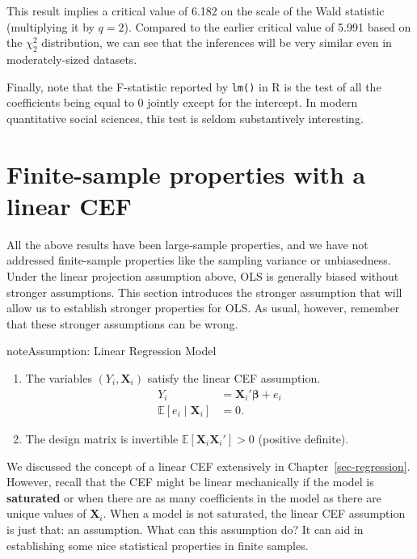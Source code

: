 \documentclass[
  13pt,
  letterpaper,
  DIV=11,
  numbers=noendperiod]{scrreprt}
\newcommand{\mb}{\bm}
\newcommand{\E}{\mathbb{E}}
\newcommand{\X}{\mb{X}}
\newcommand{\bfbeta}{\mb{\beta}}
\theoremstyle{plain}
\theoremstyle{plain}
\theoremstyle{definition}
\theoremstyle{definition}
\theoremstyle{remark}
\begin{document}
This result implies a critical value of 6.182 on the scale of the Wald
statistic (multiplying it by \(q = 2\)). Compared to the earlier
critical value of 5.991 based on the \(\chi^2_2\) distribution, we can
see that the inferences will be very similar even in moderately-sized
datasets.

Finally, note that the F-statistic reported by \texttt{lm()} in R is the
test of all the coefficients being equal to 0 jointly except for the
intercept. In modern quantitative social sciences, this test is seldom
substantively interesting.

\section{Finite-sample properties with a linear
CEF}\label{finite-sample-properties-with-a-linear-cef}

All the above results have been large-sample properties, and we have not
addressed finite-sample properties like the sampling variance or
unbiasedness. Under the linear projection assumption above, OLS is
generally biased without stronger assumptions. This section introduces
the stronger assumption that will allow us to establish stronger
properties for OLS. As usual, however, remember that these stronger
assumptions can be wrong.

\begin{bookcallout}{note}{Assumption: Linear Regression Model}

\begin{enumerate}
\def\labelenumi{\arabic{enumi}.}
\item
  The variables \((Y_{i}, \X_{i})\) satisfy the linear CEF assumption.
  \[ 
  \begin{aligned}
    Y_{i} &= \X_{i}'\bfbeta + e_{i} \\
    \E[e_{i}\mid \X_{i}] & = 0.
  \end{aligned}
  \]
\item
  The design matrix is invertible \(\E[\X_{i}\X_{i}'] > 0\) (positive
  definite).
\end{enumerate}

\end{bookcallout}

We discussed the concept of a linear CEF extensively in
Chapter~\ref{sec-regression}. However, recall that the CEF might be
linear mechanically if the model is \textbf{saturated} or when there are
as many coefficients in the model as there are unique values of
\(\X_i\). When a model is not saturated, the linear CEF assumption is
just that: an assumption. What can this assumption do? It can aid in
establishing some nice statistical properties in finite samples.
\end{document}
